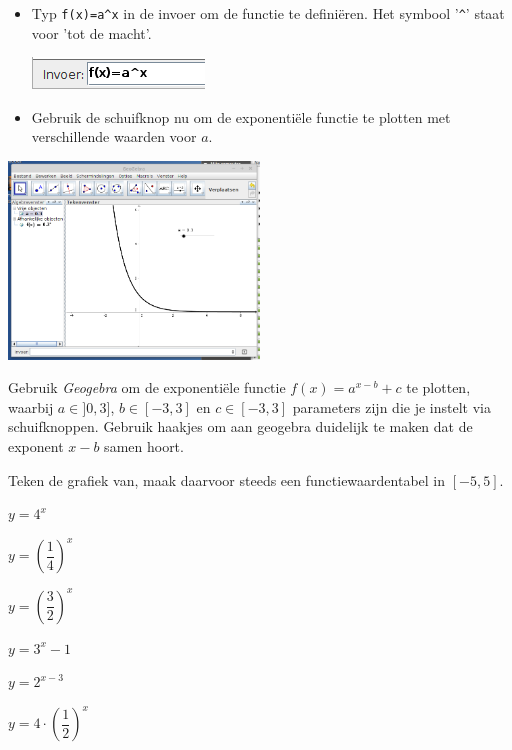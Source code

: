\documentclass[12pt,twoside]{article}
\begin{document}
\begin{oefening}
\begin{itemize}
\begin{minipage}[t]{0.7\textwidth}
\begin{center}
  \end{center}
  \end{minipage}
  \item 
  \begin{minipage}[t]{0.6\textwidth}
  \vspace{0pt}
  Typ \verb#f(x)=a^x# in de invoer om de functie te definiëren. Het symbool '\verb#^#' staat voor 'tot de macht'.
  \end{minipage}
  \begin{minipage}[t]{0.4\textwidth}
  \vspace{0pt}
  \begin{center}
    \includegraphics{gg_invoer_funct}
  \end{center}
  \end{minipage}
  \item Gebruik de schuifknop nu om de exponentiële functie te plotten met verschillende waarden voor $a$.
\end{itemize}
\begin{center}
  \includegraphics[width=0.5\textwidth]{gg_afgewerkt}
\end{center}
\end{oefening}

\begin{oefening}
Gebruik {\em Geogebra} om de exponentiële functie $f(x)=a^{x-b}+c$ te plotten, waarbij $a\in]0,3]$, $b\in[-3,3]$ en $c\in[-3,3]$ parameters zijn die je instelt via schuifknoppen. Gebruik haakjes om aan geogebra duidelijk te maken dat de exponent $x-b$ samen hoort.
\end{oefening}

\begin{oefening}
Teken de grafiek van, maak daarvoor steeds een functiewaardentabel in $[-5,5]$.
\begin{exlist}{2}
  \item $y=4^x$
  \item $y=\left(\dfrac{1}{4}\right)^x$
  \item $y=\left(\dfrac{3}{2}\right)^x$
  \item $y=3^x-1$
  \item $y=2^{x-3}$
  \item $y=4\cdot \left(\dfrac{1}{2}\right)^x$
\end{exlist}
\end{oefening}
\end{document}
